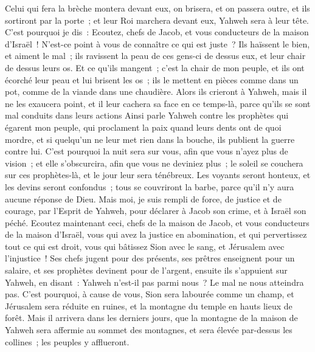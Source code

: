 \begin{multicols}{2}
Celui qui fera la brèche montera devant eux, on brisera, et on passera outre, et ils sortiront par la porte~; et leur Roi marchera devant eux, Yahweh sera à leur tête.
\VerseOne{}C'est pourquoi je dis~: Ecoutez, chefs de Jacob, et vous conducteurs de la maison d'Israël~! N'est-ce point à vous de connaître ce qui est juste~?
Ils haïssent le bien, et aiment le mal~; ils ravissent la peau de ces gens-ci de dessus eux, et leur chair de dessus leurs os.
 Et ce qu'ils mangent~; c'est la chair de mon peuple, et ils ont écorché leur peau et lui brisent les os~; ils le mettent en pièces comme dans un pot, comme de la viande dans une chaudière.
Alors ils crieront à Yahweh, mais il ne les exaucera point, et il leur cachera sa face en ce temps-là, parce qu'ils se sont mal conduits dans leurs actions
Ainsi parle Yahweh contre les prophètes qui égarent mon peuple, qui proclament la paix quand leurs dents ont de quoi mordre, et si quelqu'un ne leur met rien dans la bouche, ils publient la guerre contre lui.
C'est pourquoi la nuit sera sur vous, afin que vous n'ayez plus de vision~; et elle s'obscurcira, afin que vous ne deviniez plus~; le soleil se couchera sur ces prophètes-là, et le jour leur sera ténébreux.
Les voyants seront honteux, et les devins seront confondus~; tous se couvriront la barbe, parce qu'il n'y aura aucune réponse de Dieu.
Mais moi, je suis rempli de force, de justice et de courage, par l'Esprit de Yahweh, pour déclarer à Jacob son crime, et à Israël son péché.
Ecoutez maintenant ceci, chefs de la maison de Jacob, et vous conducteurs de la maison d'Israël, vous qui avez la justice en abomination, et qui pervertissez tout ce qui est droit,
vous qui bâtissez Sion avec le sang, et Jérusalem avec l'injustice~!
Ses chefs jugent pour des présents, ses prêtres enseignent pour un salaire, et ses prophètes devinent pour de l'argent, ensuite ils s'appuient sur Yahweh, en disant~: Yahweh n'est-il pas parmi nous~? Le mal ne nous atteindra pas.
C'est pourquoi, à cause de vous, Sion sera labourée comme un champ, et Jérusalem sera réduite en ruines, et la montagne du temple en hauts lieux de forêt.
\VerseOne{}Mais il arrivera dans les derniers jours, que la montagne de la maison de Yahweh sera affermie au sommet des montagnes, et sera élevée par-dessus les collines~; les peuples y afflueront.

\end{multicols}
